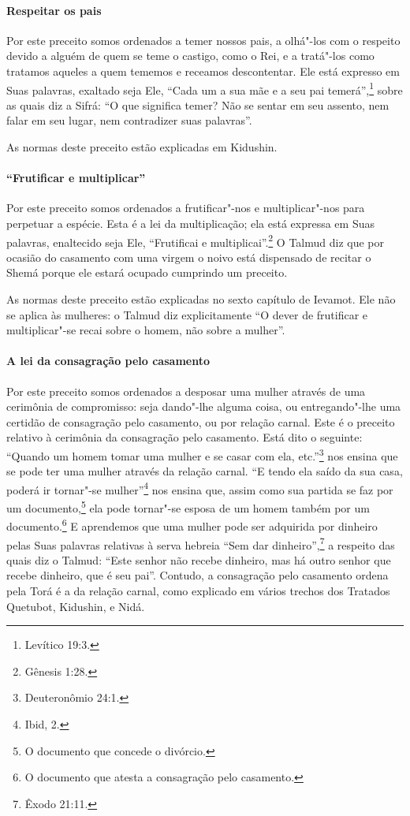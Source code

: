 \begin{multicols}{2}
\paragraph{Respeitar os pais}

Por este preceito somos ordenados a temer nossos pais, a olhá"-los com o
respeito devido a alguém de quem se teme o castigo, como o Rei, e a
tratá"-los como tratamos aqueles a quem tememos e receamos descontentar.
Ele está expresso em Suas palavras, exaltado seja Ele, ``Cada um a sua
mãe e a seu pai temerá'',\footnote{Levítico 19:3.} sobre as quais diz a Sifrá\starr:
``O que significa temer? Não se sentar em seu assento, nem falar em seu
lugar, nem contradizer suas palavras''.

As normas deste preceito estão explicadas em Kidushin\starr.

\paragraph{``Frutificar e multiplicar''}

Por este preceito somos ordenados a frutificar"-nos e multiplicar"-nos
para perpetuar a espécie. Esta é a lei da multiplicação; ela está
expressa em Suas palavras, enaltecido seja Ele, ``Frutificai e
multiplicai''.\footnote{Gênesis 1:28.} O Talmud\starr{} diz que por ocasião do casamento
com uma virgem o noivo está dispensado de recitar o Shemá\starr{} porque ele
estará ocupado cumprindo um preceito.

As normas deste preceito estão explicadas no sexto capítulo de Ievamot\starr.
Ele não se aplica às mulheres: o Talmud\starr{} diz explicitamente ``O dever de
frutificar e multiplicar"-se recai sobre o homem, não sobre a mulher''.

\paragraph{A lei da consagração pelo casamento}

Por este preceito somos ordenados a desposar uma mulher através de uma
cerimônia de compromisso: seja dando"-lhe alguma coisa, ou entregando"-lhe
uma certidão de consagração pelo casamento, ou por relação carnal. Este
é o preceito relativo à cerimônia da consagração pelo casamento. Está
dito o seguinte: ``Quando um homem tomar uma mulher e se casar com ela,
etc.''\footnote{Deuteronômio 24:1.} nos ensina que se pode ter uma mulher através da relação
carnal. ``E tendo ela saído da sua casa, poderá ir tornar"-se mulher''\footnote{Ibid, 2.} nos ensina que, assim como sua partida se faz por um
documento,\footnote{O documento que concede o divórcio.} ela pode tornar"-se esposa de um homem
também por um documento.\footnote{O documento que atesta a consagração pelo casamento.} E aprendemos que uma
mulher pode ser adquirida por dinheiro pelas Suas palavras relativas à
serva hebreia ``Sem dar dinheiro'',\footnote{Êxodo 21:11.} a respeito das quais
diz o Talmud\starr: ``Este senhor não recebe dinheiro, mas há outro senhor que
recebe dinheiro, que é seu pai''. Contudo, a consagração pelo casamento
ordena pela Torá\starr{} é a da relação carnal, como explicado em vários
trechos dos Tratados Quetubot\starr, Kidushin\starr, e Nidá\starr.


\end{multicols}
